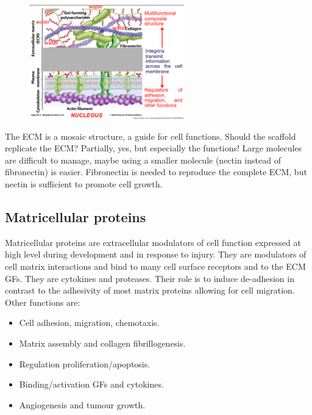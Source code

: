 	\begin{figure}[ht]
	\centering
	\includegraphics[width=0.6\textwidth]{structure}
	\caption{\label{fig:structure}}
	\end{figure}

	\noindent
	The ECM is a mosaic structure, a guide for cell functions.
	Should the scaffold replicate the ECM? Partially, yes, but especially the functions!
	Large molecules are difficult to manage, maybe using a smaller molecule (nectin instead of fibronectin) is easier.
	Fibronectin is needed to reproduce the complete ECM, but nectin is sufficient to promote cell growth.


	\subsection{Matricellular proteins}
	Matricellular proteins are extracellular modulators of cell function expressed at high level during development and in response to injury.
	They are modulators of cell matrix interactions and bind to many cell surface receptors and to the ECM GFs.
	They are cytokines and proteases.
	Their role is to induce de-adhesion in contrast to the adhesivity of most matrix proteins allowing for cell migration.
	Other functions are:

	\begin{multicols}{2}
		\begin{itemize}
			\item Cell adhesion, migration, chemotaxis.
			\item Matrix assembly and collagen fibrillogenesis.
			\item Regulation proliferation/apoptosis.
			\item Binding/activation GFs and cytokines.
			\item Angiogenesis and tumour growth.
		\end{itemize}
	\end{multicols}

